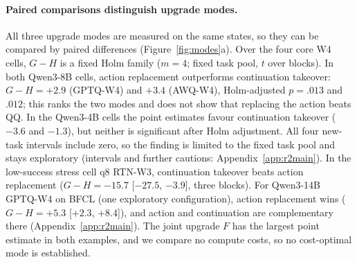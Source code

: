 \paragraph{Paired comparisons distinguish upgrade modes.} All three upgrade modes are measured on the same states, so they can be compared by paired differences (Figure~\ref{fig:modes}a). Over the four core W4 cells, $G-H$ is a fixed Holm family ($m=4$; fixed task pool, $t$ over blocks). In both Qwen3-8B cells, action replacement outperforms continuation takeover: $G-H=+2.9$ (GPTQ-W4) and $+3.4$\pp{} (AWQ-W4), Holm-adjusted $p=.013$ and $.012$; this ranks the two modes and does not show that replacing the action beats QQ. In the Qwen3-4B cells the point estimates favour continuation takeover ($-3.6$ and $-1.3$\pp{}), but neither is significant after Holm adjustment. All four new-task intervals include zero, so the finding is limited to the fixed task pool and stays exploratory (intervals and further cautions: Appendix~\ref{app:r2main}). %
In the low-success stress cell q8 RTN-W3, continuation takeover beats action replacement ($G-H=-15.7$ [$-27.5$, $-3.9$]\pp{}, three blocks). %
For Qwen3-14B GPTQ-W4 on BFCL (one exploratory configuration), action replacement wins ($G-H=+5.3$ [$+2.3$, $+8.4$]\pp{}), and action and continuation are complementary there (Appendix~\ref{app:r2main}). %
The joint upgrade $F$ has the largest point estimate in both examples, and we compare no compute costs, so no cost-optimal mode is established.


